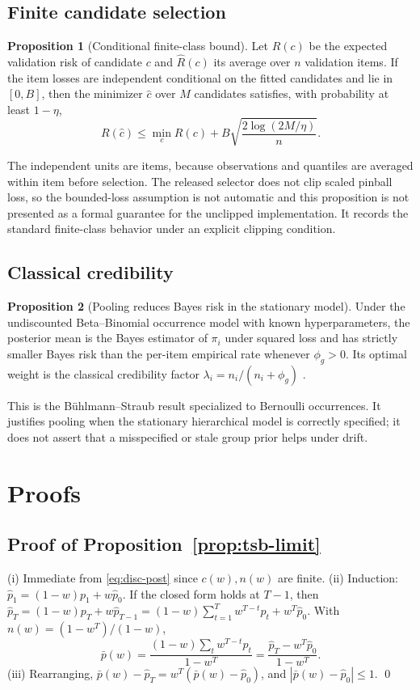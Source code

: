 \documentclass[twocolumn,10pt]{article}
\theoremstyle{definition}
\newtheorem{proposition}{Proposition}
\begin{document}
\subsection{Finite candidate selection}

\begin{proposition}[Conditional finite-class bound]
\label{prop:oracle}
Let $R(c)$ be the expected validation risk of candidate $c$ and
$\hat R(c)$ its average over $n$ validation items. If the item losses are
independent conditional on the fitted candidates and lie in $[0,B]$, then
the minimizer $\hat c$ over $M$ candidates satisfies, with probability at
least $1-\eta$,
\[
R(\hat c)\le\min_cR(c)+B\sqrt{\frac{2\log(2M/\eta)}{n}}.
\]
\end{proposition}

The independent units are items, because observations and quantiles are
averaged within item before selection. The released selector does not
clip scaled pinball loss, so the bounded-loss assumption is not automatic
and this proposition is not presented as a formal guarantee for the
unclipped implementation. It records the standard finite-class behavior
under an explicit clipping condition.

\subsection{Classical credibility}

\begin{proposition}[Pooling reduces Bayes risk in the stationary model]
\label{prop:credibility}
Under the undiscounted Beta--Binomial occurrence model with known
hyperparameters, the posterior mean is the Bayes estimator of $\pi_i$
under squared loss and has strictly smaller Bayes risk than the per-item
empirical rate whenever $\phi_g>0$. Its optimal weight is the classical
credibility factor $\lambda_i=n_i/(n_i+\phi_g)$
\citep{buhlmann1967}.
\end{proposition}

This is the B\"uhlmann--Straub result specialized to Bernoulli
occurrences. It justifies pooling when the stationary hierarchical model
is correctly specified; it does not assert that a misspecified or stale
group prior helps under drift.

\section{Proofs}\label{app:proofs}

\subsection{Proof of Proposition~\ref{prop:tsb-limit}}
(i) Immediate from \eqref{eq:disc-post} since $c(w),n(w)$ are finite.
(ii) Induction: $\hat p_1=(1-w)p_1+w\hat p_0$. If the closed form holds at
$T-1$, then
$\hat p_T=(1-w)p_T+w\hat p_{T-1}=(1-w)\sum_{t=1}^{T}w^{T-t}p_t+w^{T}\hat p_0$.
With $n(w)=(1-w^{T})/(1-w)$,
\[
\bar p(w)=\frac{(1-w)\sum_t w^{T-t}p_t}{1-w^{T}}
=\frac{\hat p_T-w^{T}\hat p_0}{1-w^{T}}.
\]
(iii) Rearranging, $\bar p(w)-\hat p_T=w^{T}(\bar p(w)-\hat p_0)$, and
$|\bar p(w)-\hat p_0|\le1$. \qed
\end{document}

